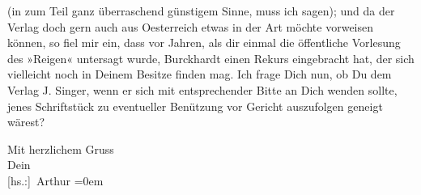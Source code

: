               (in zum Teil ganz überraschend günstigem Sinne, muss ich sagen); und da der Verlag
               doch gern auch aus Oesterreich etwas in der Art
               möchte vorweisen können, so fiel mir ein, dass vor Jahren, als dir einmal die
               öffentliche Vorlesung des »Reigen« untersagt
               wurde, Burckhardt einen Rekurs eingebracht
               hat, der sich vielleicht noch in Deinem Besitze finden mag. Ich frage Dich nun, ob Du
               dem Verlag J. Singer, wenn er sich {\pb}mit entsprechender
               Bitte an Dich wenden sollte, jenes Schriftstück zu eventueller Benützung vor Gericht
               auszufolgen geneigt wärest? \pend
           
\pstart
           Mit herzlichem Gruss{\\[\baselineskip]}Dein{\\[\baselineskip]}\spacefill\mbox{{[}hs.:{]} Arthur}\pend
           \leftskip=0em{}\endnumbering{}  
      